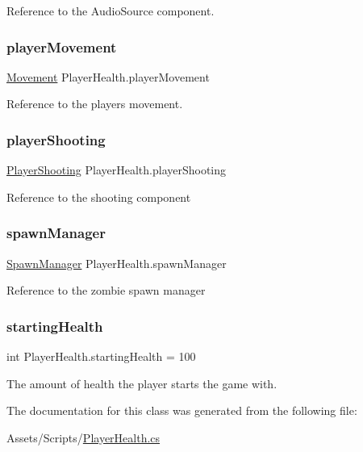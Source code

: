 Reference to the Audio\+Source component. \mbox{\label{class_player_health_ab1b3b581903987c45280a75c5ceeb8c5}} 
\subsubsection{\texorpdfstring{playerMovement}{playerMovement}}
{\footnotesize\ttfamily \mbox{\hyperlink{class_movement}{Movement}} Player\+Health.\+player\+Movement\hspace{0.3cm}{\ttfamily [private]}}

Reference to the player\textquotesingle{}s movement. \mbox{\label{class_player_health_a3bef2613f576b0459f43eca37b7f7f91}} 
\subsubsection{\texorpdfstring{playerShooting}{playerShooting}}
{\footnotesize\ttfamily \mbox{\hyperlink{class_player_shooting}{Player\+Shooting}} Player\+Health.\+player\+Shooting\hspace{0.3cm}{\ttfamily [private]}}

Reference to the shooting component \mbox{\label{class_player_health_af8a4d63d2e99b1cdbc93b07bf2741d9f}} 
\subsubsection{\texorpdfstring{spawnManager}{spawnManager}}
{\footnotesize\ttfamily \mbox{\hyperlink{class_spawn_manager}{Spawn\+Manager}} Player\+Health.\+spawn\+Manager}

Reference to the zombie spawn manager \mbox{\label{class_player_health_ab688986266097903627ed2aebf0aee7b}} 
\subsubsection{\texorpdfstring{startingHealth}{startingHealth}}
{\footnotesize\ttfamily int Player\+Health.\+starting\+Health = 100}

The amount of health the player starts the game with. 

The documentation for this class was generated from the following file\+:\begin{DoxyCompactItemize}
\item 
Assets/\+Scripts/\mbox{\hyperlink{_player_health_8cs}{Player\+Health.\+cs}}\end{DoxyCompactItemize}
